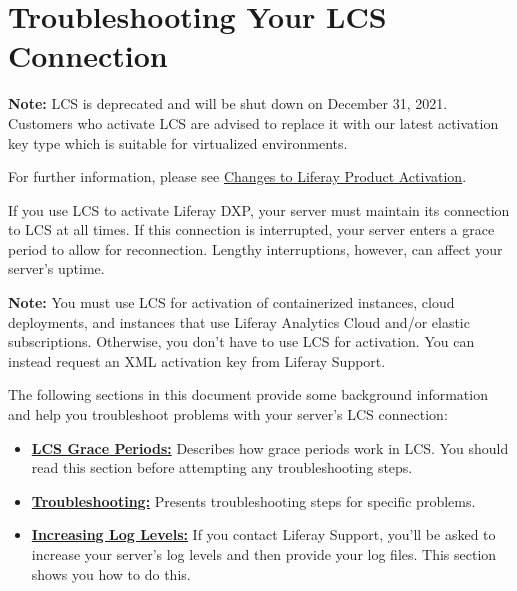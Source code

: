 \section{Troubleshooting Your LCS
Connection}\label{troubleshooting-your-lcs-connection}

\noindent\hrulefill

\textbf{Note:} LCS is deprecated and will be shut down on December 31,
2021. Customers who activate LCS are advised to replace it with our
latest activation key type which is suitable for virtualized
environments.

For further information, please see
\href{https://help.liferay.com/hc/en-us/articles/4402347960845-Changes-to-Liferay-Product-Activation}{Changes
to Liferay Product Activation}.

\noindent\hrulefill

If you use LCS to activate Liferay DXP, your server must maintain its
connection to LCS at all times. If this connection is interrupted, your
server enters a grace period to allow for reconnection. Lengthy
interruptions, however, can affect your server's uptime.

\noindent\hrulefill

\textbf{Note:} You must use LCS for activation of containerized
instances, cloud deployments, and instances that use Liferay Analytics
Cloud and/or elastic subscriptions. Otherwise, you don't have to use LCS
for activation. You can instead request an XML activation key from
Liferay Support.

\noindent\hrulefill

The following sections in this document provide some background
information and help you troubleshoot problems with your server's LCS
connection:

\begin{itemize}
\tightlist
\item
  \hyperref[lcs-grace-periods]{\textbf{LCS Grace Periods:}} Describes
  how grace periods work in LCS. You should read this section before
  attempting any troubleshooting steps.
\item
  \hyperref[troubleshooting]{\textbf{Troubleshooting:}} Presents
  troubleshooting steps for specific problems.
\item
  \hyperref[increasing-log-levels]{\textbf{Increasing Log Levels:}} If
  you contact Liferay Support, you'll be asked to increase your server's
  log levels and then provide your log files. This section shows you how
  to do this.
\end{itemize}

